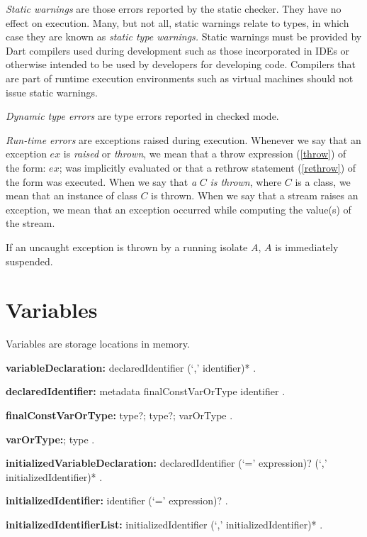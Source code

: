 \documentclass{article}
\newcommand{\code}[1]{{\sf #1}}
\begin{document}
\LMHash{}
{\em Static  warnings} are those errors reported by the static checker. They have no effect on execution. Many, but not all, static warnings relate to types, in which case they are known as {\em static type warnings.} Static warnings must be provided by Dart compilers used during development such as those incorporated in IDEs or otherwise intended to be used by developers for developing code. Compilers that are part of runtime execution environments such as virtual machines should not issue static warnings.

\LMHash{}
{\em Dynamic type errors} are type errors reported in checked mode.

\LMHash{}
{\em Run-time errors} are exceptions raised during execution. Whenever we say that an exception $ex$ is {\em raised} or {\em thrown}, we mean that a throw expression  (\ref{throw}) of the form: \code{\THROW{} $ex$;} was implicitly evaluated or that a rethrow statement (\ref{rethrow}) of the form \code{\RETHROW} was executed. When we say that {\em a} $C$ {\em is thrown}, where $C$ is a class, we mean that an instance of class $C$ is thrown. When we say that a stream raises an exception, we mean that an exception occurred while computing the value(s) of the stream.

\LMHash{}
If an uncaught exception is thrown by a running isolate $A$, $A$ is immediately suspended.


\section{Variables}

\LMHash{}
Variables are storage locations in memory.

\begin{grammar}
{\bf variableDeclaration:}
      declaredIdentifier (`,' identifier)*
      .

{\bf declaredIdentifier:}
      metadata finalConstVarOrType identifier
    .

{\bf finalConstVarOrType:}\FINAL{} type?;
           \CONST{} type?;
	varOrType
    .

 {\bf varOrType:}\VAR{};
	type
    .

 {\bf initializedVariableDeclaration:}
      declaredIdentifier (`=' expression)? (`,' initializedIdentifier)* %
    .

{\bf initializedIdentifier:}
      identifier (`=' expression)? %
    .

{\bf initializedIdentifierList:}
      initializedIdentifier (`,' initializedIdentifier)*
    .




  \end{grammar}
\end{document}
